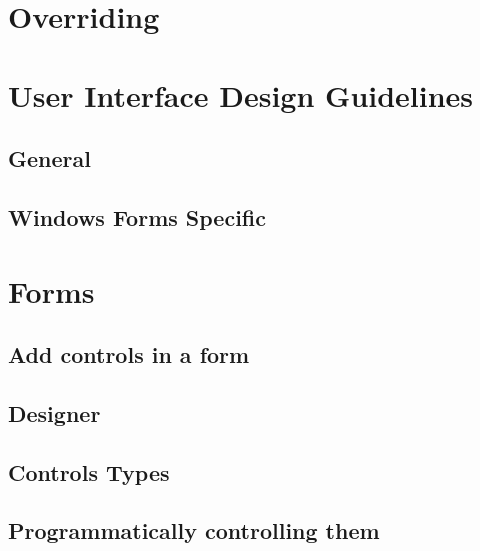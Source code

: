 \documentclass[
]{book}
\theoremstyle{definition}
\theoremstyle{definition}
\theoremstyle{definition}
\theoremstyle{remark}
\begin{document}
\hypertarget{overriding}{%
\section{Overriding}\label{overriding}}

\hypertarget{user-interface-design-guidelines}{%
\section{User Interface Design Guidelines}\label{user-interface-design-guidelines}}

\hypertarget{general}{%
\subsection{General}\label{general}}

\hypertarget{windows-forms-specific}{%
\subsection{Windows Forms Specific}\label{windows-forms-specific}}

\hypertarget{forms}{%
\section{Forms}\label{forms}}

\hypertarget{add-controls-in-a-form}{%
\subsection{Add controls in a form}\label{add-controls-in-a-form}}

\hypertarget{designer}{%
\subsection{Designer}\label{designer}}

\hypertarget{controls-types}{%
\subsection{Controls Types}\label{controls-types}}

\hypertarget{programmatically-controlling-them}{%
\subsection{Programmatically controlling them}\label{programmatically-controlling-them}}
\end{document}
